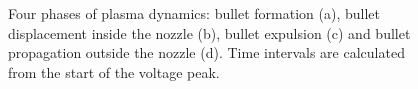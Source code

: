 \begin{figure}
 \centering
 \hfill
 
 \hfill
 \caption{Four phases of plasma dynamics: bullet formation (a), bullet displacement inside the nozzle (b), bullet expulsion (c) and bullet propagation outside the nozzle (d). Time intervals are calculated from the start of the voltage peak.}
 \label{fig:bullet_es}
\end{figure}


